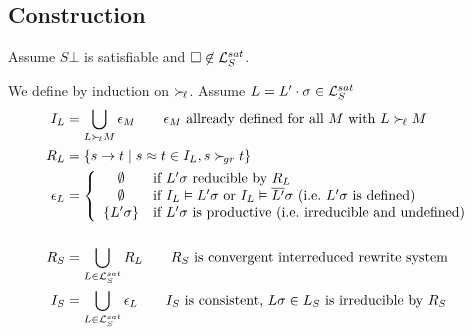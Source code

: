 \documentclass[%
handout,
]{beamer}
\begin{document}
\subsection{Construction}
\begin{frame}
    Assume $S\bot$ is satisfiable and
    $\square\not\in\mathcal{L}_S^{sat}$.

    We define by induction on $\mathrel\succ_{\!\ell}$.
    Assume $L = L'\cdot\sigma \in\mathcal{L}_S^{sat}$
    \begin{align*}
        I_L &= \bigcup_{L\succL M}\epsilon_M
        \tag*{$\epsilon_M$ allready defined for all $M$ with $L\succL M$}
        \\
        R_L &= \{ s \to t \mid s\mEQ t\in I_L, s\succG t \}
        \\
        \epsilon_L &= \left\{
            \begin{array}{cl}
                \emptyset &\text{if }
                L'\sigma\text{ reducible by }R_L
                \\
                \emptyset &\text{if }
                I_L\vDash L'\sigma
                \text{ or }
                I_L\vDash \overline{L'}\sigma
                \text{ (i.e.~}L'\sigma\text{ is defined)}
                \\
                \{ L'\sigma \}
                &\text{if }L'\sigma \text{ is productive (i.e.~irreducible and undefined)}
            \end{array}
        \right.\\[1.4em]
        R_S &= \bigcup_{L\in\mcL_S^{sat}} R_L \tag*{$R_S$ is convergent interreduced rewrite system}
        \\
        I_S &= \bigcup_{L\in\mcL_S^{sat}} \epsilon_L \tag*{$I_S$ is consistent, $L\sigma\in L_S$ is irreducible by $R_S$}
    \end{align*}
\end{frame}
\end{document}
